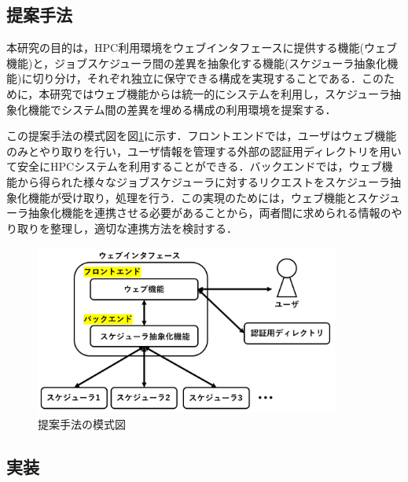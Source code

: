 \subsection{提案手法}
本研究の目的は，HPC利用環境をウェブインタフェースに提供する機能(ウェブ機能)と，ジョブスケジューラ間の差異を抽象化する機能(スケジューラ抽象化機能)に切り分け，それぞれ独立に保守できる構成を実現することである．このために，本研究ではウェブ機能からは統一的にシステムを利用し，スケジューラ抽象化機能でシステム間の差異を埋める構成の利用環境を提案する．\par
この提案手法の模式図を図\ref{fig6}に示す．フロントエンドでは，ユーザはウェブ機能のみとやり取りを行い，ユーザ情報を管理する外部の認証用ディレクトリを用いて安全にHPCシステムを利用することができる．バックエンドでは，ウェブ機能から得られた様々なジョブスケジューラに対するリクエストをスケジューラ抽象化機能が受け取り，処理を行う．この実現のためには，ウェブ機能とスケジューラ抽象化機能を連携させる必要があることから，両者間に求められる情報のやり取りを整理し，適切な連携方法を検討する．\par

\begin{figure}[tb]
    \centering
    \includegraphics[width=100mm]{./fig/proposed_method.png}
    \caption{提案手法の模式図}
    \label{fig6}
\end{figure}

\subsection{実装}
